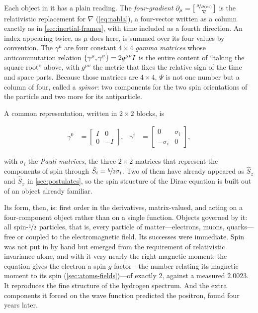     Each object in it has a plain reading. The \emph{four-gradient} $\partial_{\mu} = \left[\begin{smallmatrix} \nicefrac{\partial}{\partial(ct)} \\ \nabla \end{smallmatrix}\right]$ is the relativistic replacement for $\nabla$ (\cref{eq:nabla}), a four-vector written as a column exactly as in \cref{sec:inertial-frames}, with time included as a fourth direction. An index appearing twice, as $\mu$ does here, is summed over its four values by convention. The $\gamma^{\mu}$ are four constant $4\times4$ \emph{gamma matrices} whose anticommutation relation $\left\{\gamma^{\mu},\gamma^{\nu}\right\} = 2g^{\mu\nu}I$ is the entire content of \enquote{taking the square root} above, with $g^{\mu\nu}$ the metric that fixes the relative sign of the time and space parts. Because those matrices are $4\times4$, $\Psi$ is not one number but a column of four, called a \emph{spinor}: two components for the two spin orientations of the particle and two more for its antiparticle.

    A common representation, written in $2\times2$ blocks, is

    \begin{align*}
        \gamma^0 &=
        \begin{bmatrix}
            I & 0\\
            0 & -I
        \end{bmatrix}, &
        \gamma^i &=
        \begin{bmatrix}
            0 & \sigma_i\\
            -\sigma_i & 0
        \end{bmatrix},
    \end{align*}

    with $\sigma_i$ the \emph{Pauli matrices}, the three $2\times2$ matrices that represent the components of spin through $\hat{S}_{i} = \nicefrac{\hbar}{2}\sigma_{i}$. Two of them have already appeared as $\hat{S}_{z}$ and $\hat{S}_{x}$ in \cref{sec:postulates}, so the spin structure of the Dirac equation is built out of an object already familiar.

    Its form, then, is: first order in the derivatives, matrix-valued, and acting on a four-component object rather than on a single function. Objects governed by it: all spin-$\nicefrac{1}{2}$ particles, that is, every particle of matter---electrons, muons, quarks---free or coupled to the electromagnetic field. Its successes were immediate. Spin was not put in by hand but emerged from the requirement of relativistic invariance alone, and with it very nearly the right magnetic moment: the equation gives the electron a spin $g$-factor---the number relating its magnetic moment to its spin (\cref{sec:atoms-fields})---of exactly $2$, against a measured $2.0023$. It reproduces the fine structure of the hydrogen spectrum. And the extra components it forced on the wave function predicted the positron, found four years later.

